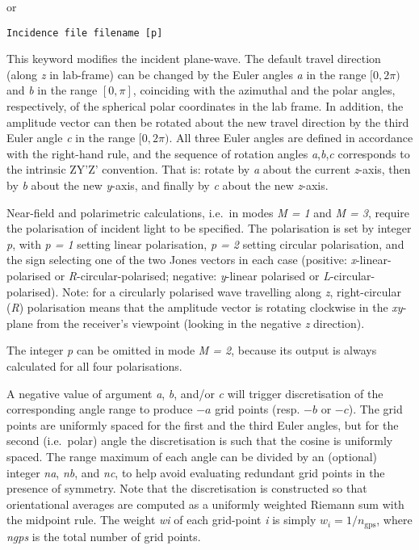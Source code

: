 \documentclass[
]{article}
\begin{document}
or

\texttt{Incidence\ file\ filename\ {[}p{]}}

This keyword modifies the incident plane-wave. The default travel
direction (along \emph{z} in lab-frame) can be changed by the Euler
angles \emph{a} in the range \([0,2\pi)\) and \emph{b} in the range
\([0,\pi]\), coinciding with the azimuthal and the polar angles,
respectively, of the spherical polar coordinates in the lab frame. In
addition, the amplitude vector can then be rotated about the new travel
direction by the third Euler angle \emph{c} in the range \([0,2\pi)\).
All three Euler angles are defined in accordance with the right-hand
rule, and the sequence of rotation angles \emph{a},\emph{b},\emph{c}
corresponds to the intrinsic ZY'Z' convention. That is: rotate by
\emph{a} about the current \emph{z}-axis, then by \emph{b} about the new
\emph{y}-axis, and finally by \emph{c} about the new \emph{z}-axis.

Near-field and polarimetric calculations, i.e.~in modes \emph{M = 1} and
\emph{M = 3}, require the polarisation of incident light to be
specified. The polarisation is set by integer \emph{p}, with
\emph{\textbar p\textbar{} = 1} setting linear polarisation,
\emph{\textbar p\textbar{} = 2} setting circular polarisation, and the
sign selecting one of the two Jones vectors in each case (positive:
\emph{x}-linear-polarised or \emph{R}-circular-polarised; negative:
\emph{y}-linear polarised or \emph{L}-circular-polarised). Note: for a
circularly polarised wave travelling along \emph{z}, right-circular
(\emph{R}) polarisation means that the amplitude vector is rotating
clockwise in the \emph{xy}-plane from the receiver's viewpoint (looking
in the negative \emph{z} direction).

The integer \emph{p} can be omitted in mode \emph{M = 2}, because its
output is always calculated for all four polarisations.

A negative value of argument \emph{a}, \emph{b}, and/or \emph{c} will
trigger discretisation of the corresponding angle range to produce
\(-a\) grid points (resp. \(-b\) or \(-c\)). The grid points are
uniformly spaced for the first and the third Euler angles, but for the
second (i.e.~polar) angle the discretisation is such that the cosine is
uniformly spaced. The range maximum of each angle can be divided by an
(optional) integer \emph{na}, \emph{nb}, and \emph{nc}, to help avoid
evaluating redundant grid points in the presence of symmetry. Note that
the discretisation is constructed so that orientational averages are
computed as a uniformly weighted Riemann sum with the midpoint rule. The
weight \emph{wi} of each grid-point \emph{i} is simply
\(w_i = 1/n_\text{gps}\), where \emph{ngps} is the total number of grid
points.
\end{document}

